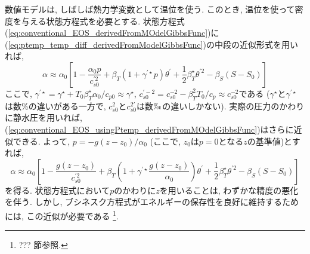 数値モデルは, しばしば熱力学変数として温位を使う. 
このとき, 温位を使って密度を与える状態方程式を必要とする. 
状態方程式(\ref{eq:conventional_EOS_derivedFromMOdelGibbsFunc})に
(\ref{eq:ptemp_temp_diff_derivedFromModelGibbsFunc})の中段の近似形式を用いれば, 
\begin{equation}
 \alpha \approx \alpha_0 \left[
   1 - \dfrac{\alpha_0 p}{c_{s0}^{\prime 2}} + \beta_T(1 + \gamma^{\prime \star} p)\theta^\prime
   + \dfrac{1}{2} \beta_T^\star \theta^{\prime 2} - \beta_S(S-S_0)
  \right]
\label{eq:conventional_EOS_usingPtemp_derivedFromMOdelGibbsFunc}
\end{equation}
ここで, 
$\gamma^{\prime \star} = \gamma^\star + T_0 \beta_T^\star \alpha_0 /c_{p0} \approx \gamma^\star$, 
$c_{s0}^{\prime -2} = c_{s0}^{-2} - \beta_T^2 T_0/c_p \approx c_{s0}^{-2}$である 
($\gamma^\star$と$\gamma^{\prime \star}$は数\%の違いがある一方で,  
$c_{s0}^2$と$c_{s0}^{2 \prime}$は数$\permil$の違いしかない).
実際の圧力のかわりに静水圧を用いれば, (\ref{eq:conventional_EOS_usingPtemp_derivedFromMOdelGibbsFunc})はさらに近似できる.
よって, $p=-g(z-z_0)/\alpha_0$ (ここで, $z_0$は$p=0$となる$z$の基準値)とすれば, 
\begin{equation}
 \alpha \approx \alpha_0 \left[
   1 - \dfrac{g(z - z_0)}{c_{s0}^{\prime 2}} + \beta_T(1 + \gamma^{\prime \star} \dfrac{g(z-z_0)}{\alpha_0})\theta^\prime
   + \dfrac{1}{2} \beta_T^\star \theta^{\prime 2} - \beta_S(S-S_0)
  \right]
\label{eq:conventional_EOS_usingPtempHydroStatic_derivedFromMOdelGibbsFunc}
\end{equation}
を得る. 
状態方程式において$p$のかわりに$z$を用いることは, わずかな精度の悪化を伴う. 
しかし, ブシネスク方程式がエネルギーの保存性を良好に維持するためには, この近似が必要である%
\footnote{
??? 節参照. 
}. 